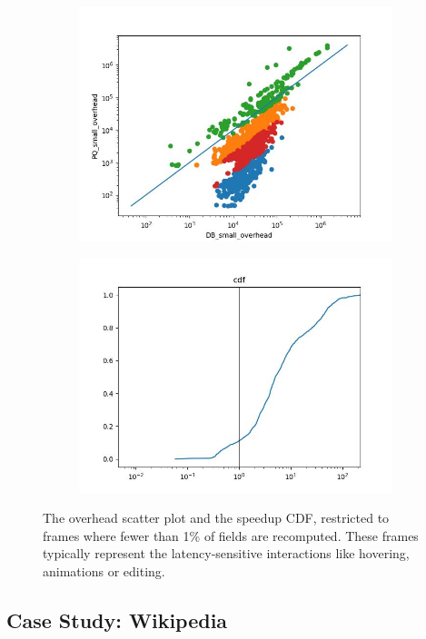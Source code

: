 \begin{figure}
\begin{subfigure}{0.5\linewidth}
    \includegraphics[width=\linewidth]{DBPQSmallOverhead.jpg}
\end{subfigure}\hfill%
\begin{subfigure}{0.5\linewidth}
    \includegraphics[width=\linewidth]{DBPQSmallCDF.jpg}
\end{subfigure}
\caption{The overhead scatter plot and the speedup CDF,
  restricted to frames where fewer than 1\% of fields
  are recomputed.
  These frames typically represent the latency-sensitive
  interactions like hovering, animations or editing.}
\label{fig:dbpq-small}
\end{figure}

\subsection{Case Study: Wikipedia}